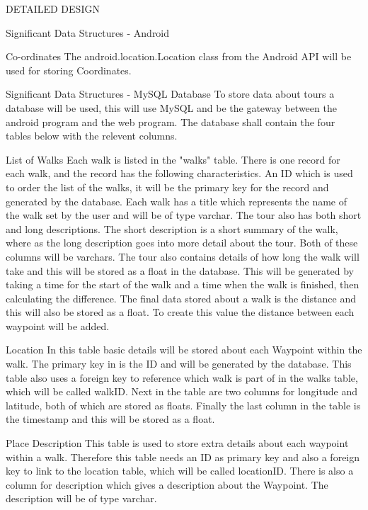 \documentclass{article}
\begin{document}
\begin{section}{DETAILED DESIGN}
\begin{subsection}{Significant Data Structures - Android}
		\begin{subsubsection}{Co-ordinates}
			The android.location.Location class from the Android API will be used for storing Coordinates.
		\end{subsubsection}
	\end{subsection}

	\begin{subsection}{Significant Data Structures - MySQL Database}
	To store data about tours a database will be used, this will use MySQL and be the gateway between the android program and the web program. The database shall contain the four tables below with the relevent columns.

		\begin{subsubsection}{List of Walks}
			Each walk is listed in the "walks" table. There is one record for each walk, and the record has 
		the following characteristics. An ID which is used to order the list of the walks, it will be the primary key for the record and generated by the database. Each walk has a title which represents the name of the walk set by the user and will be of type varchar. The tour also has both short and long descriptions. The short description is a short summary of the walk, where as the long description goes into more detail about the tour. Both of these columns will be varchars. The tour also contains details of how long the walk will take and this will be stored as a float in the database. This will be generated by taking a time for the start of the walk and a time when the walk is finished, then calculating the difference. The final data stored about a walk is the distance and this will also be stored as a float. To create this value the distance between each waypoint will be added.
		\end{subsubsection}
		
		\begin{subsubsection}{Location}
			In this table basic details will be stored about each Waypoint within the walk. The primary key in is the ID and will be generated by the database. This table also uses a foreign key to reference which walk is part of in the walks table, which will be called walkID. Next in the table are two columns for longitude and latitude, both of which are stored as floats. Finally the last column in the table is the timestamp and this will be stored as a float.
		\end{subsubsection}

		\begin{subsubsection}{Place Description}
			This table is used to store extra details about each waypoint within a walk. Therefore this table needs an ID as primary key and also a foreign key to link to the location table, which will be called locationID. There is also a column for description which gives a description about the Waypoint. The description will be of type varchar.
\end{subsubsection}
		

\end{subsection}
\end{section}
\end{document}

